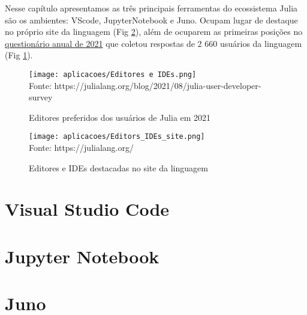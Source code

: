 %

Nesse capítulo apresentamos as três principais ferramentas do ecossistema Julia são os ambientes: VScode, JupyterNotebook e Juno. 
Ocupam lugar de destaque no próprio site da linguagem (Fig \ref{julia_editors_site}), além de ocuparem as primeiras posições no \href{https://julialang.org/blog/2021/08/julia-user-developer-survey/}{questionário anual de 2021} que coletou respostas de 2 660 usuários da linguagem (Fig \ref{julia_editors_survey}). 

   \begin{figure}[H]
    \begin{center}
        \caption{Editores preferidos dos usuários de Julia em 2021} \label{julia_editors_survey}
        \texttt{[image: aplicacoes/Editores e IDEs.png]} \\
        {\tiny \sf Fonte: https://julialang.org/blog/2021/08/julia-user-developer-survey }
    \end{center}
   \end{figure} 

   \begin{figure}[H]
    \begin{center}
        \caption{Editores e IDEs destacadas no site da linguagem} \label{julia_editors_site}
        \texttt{[image: aplicacoes/Editors\_IDEs\_site.png]} \\
        {\tiny \sf Fonte: https://julialang.org/}
    \end{center}
   \end{figure} 

\section{Visual Studio Code}

\section{Jupyter Notebook}

\section{Juno}
